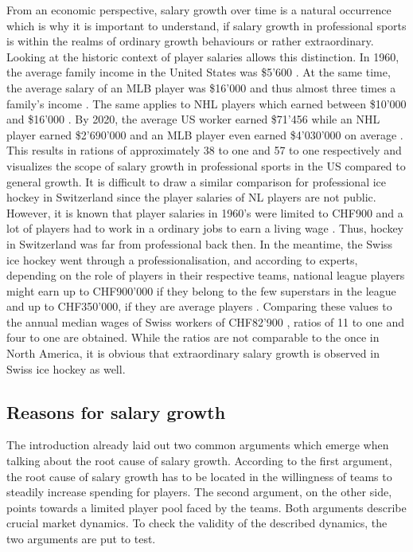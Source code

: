 \documentclass[12pt,a4paper]{article}\usepackage[]{graphicx}\usepackage[]{xcolor}
\begin{document}
From an economic perspective, salary growth over time is a natural occurrence which is why it is important to understand, if salary growth in professional sports is within the realms of ordinary growth behaviours or rather extraordinary. Looking at the historic context of player salaries allows this distinction. In 1960, the average family income in the United States was \$5'600 \citep{scammon_income_1962}. At the same time, the average salary of an MLB player was \$16'000 and thus almost three times a family's income \citep{haupert_economic_2007}. The same applies to NHL players which earned between \$10'000 and \$16'000 \citep{hockey_central_original_nodate}. By 2020, the average US worker earned \$71'456 \citep{statista_research_departement_annual_2021} while an NHL player earned \$2'690'000 and an MLB player even earned \$4'030'000 on average \citep{gough_average_2022}. This results in rations of approximately 38 to one and 57 to one respectively and visualizes the scope of salary growth in professional sports in the US compared to general growth. It is difficult to draw a similar comparison for professional ice hockey in Switzerland since the player salaries of NL players are not public. However, it is known that player salaries in 1960’s were limited to CHF900 and a lot of players had to work in a ordinary jobs to earn a living wage \citep{ koller_kanadier_2016}. Thus, hockey in Switzerland was far from professional back then. In the meantime, the Swiss ice hockey went through a professionalisation, and according to experts, depending on the role of players in their respective teams, national league players might earn up to CHF900'000 if they belong to the few superstars in the league and up to CHF350'000, if they are average players \citep{allemann_sind_2020}. Comparing these values to the annual median wages of Swiss workers of CHF82'900 \citep{bundesamt_fur_statistik_bruttoerwerbseinkommen_2021}, ratios of 11 to one and four to one are obtained. While the ratios are not comparable to the once in North America, it is obvious that extraordinary salary growth is observed in Swiss ice hockey as well.  

\subsection{Reasons for salary growth}

The introduction already laid out two common arguments which emerge when talking about the root cause of salary growth. According to the first argument, the root cause of salary growth has to be located in the willingness of teams to steadily increase spending for players. The second argument, on the other side, points towards a limited player pool faced by the teams. Both arguments describe crucial market dynamics. To check the validity of the described dynamics, the two arguments are put to test. 
\end{document}
